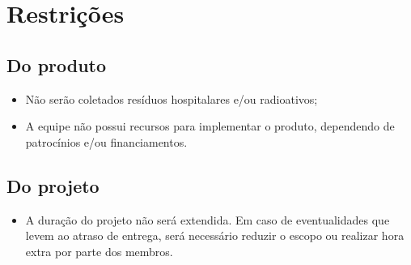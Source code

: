 \section{Restrições}

\subsection{Do produto}

  \begin{itemize}
    \item Não serão coletados resíduos hospitalares e/ou radioativos;
    \item A equipe não possui recursos para implementar o produto, dependendo
    de patrocínios e/ou financiamentos.
  \end{itemize}

\subsection{Do projeto}

  \begin{itemize}
    \item A duração do projeto não será extendida. Em caso de eventualidades que
    levem ao atraso de entrega, será necessário reduzir o escopo ou realizar
    hora extra por parte dos membros. 
  \end{itemize}
